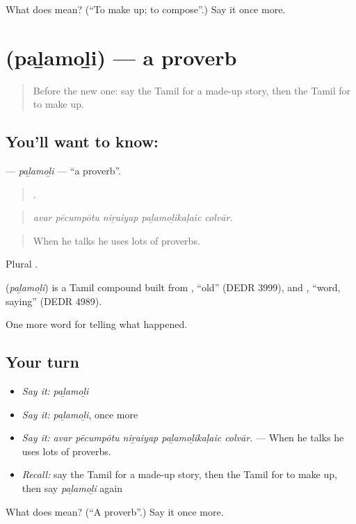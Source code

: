 \begin{tcolorbox}[breakable,colback=teal!4,colframe=teal!35!black,title={Before you move on}]
What does  mean? (\textquotedblleft{}To make up; to compose\textquotedblright{}.) Say it once more.
\end{tcolorbox}
\section[\texorpdfstring{\ta{பழமொழி} (paḻamoḻi)}{பழமொழி (paḻamoḻi)}]{ (paḻamoḻi) — a proverb}

\label{lesson:TA-C343-palamoli}



\begin{quote}
Before the new one: say the Tamil for a made-up story, then the Tamil for to make up.
\end{quote}

\subsection*{You'll want to know: }
\textbf{} — \emph{paḻamoḻi} — \textquotedblleft{}a proverb\textquotedblright{}.

\begin{quote}
    .
\end{quote}

\begin{quote}
\emph{avar pēcumpōtu niṟaiyap paḻamoḻikaḷaic colvār.}
\end{quote}

\begin{quote}
When he talks he uses lots of proverbs.
\end{quote}

Plural .

\begin{cousinweb}
\textbf{} (\emph{paḻamoḻi}) is a Tamil compound built from , \textquotedblleft{}old\textquotedblright{} (DEDR 3999), and , \textquotedblleft{}word, saying\textquotedblright{} (DEDR 4989).
\end{cousinweb}

\begin{grammarlens}[title={What you've built}]
One more word for telling what happened.
\end{grammarlens}

\subsection*{Your turn}
\begin{itemize}
\raggedright
  \item \emph{Say it:} \emph{paḻamoḻi}
  \item \emph{Say it:} \emph{paḻamoḻi}, once more
  \item \emph{Say it:} \emph{avar pēcumpōtu niṟaiyap paḻamoḻikaḷaic colvār.} — When he talks he uses lots of proverbs.
  \item \emph{Recall:} say the Tamil for a made-up story, then the Tamil for to make up, then say \emph{paḻamoḻi} again
\end{itemize}

\begin{tcolorbox}[breakable,colback=teal!4,colframe=teal!35!black,title={Before you move on}]
What does  mean? (\textquotedblleft{}A proverb\textquotedblright{}.) Say it once more.
\end{tcolorbox}
